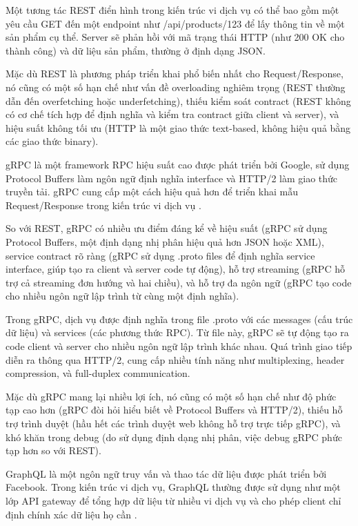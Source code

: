 Một tương tác REST điển hình trong kiến trúc vi dịch vụ có thể bao gồm một yêu cầu GET đến một endpoint như /api/products/123 để lấy thông tin về một sản phẩm cụ thể. Server sẽ phản hồi với mã trạng thái HTTP (như 200 OK cho thành công) và dữ liệu sản phẩm, thường ở định dạng JSON.

Mặc dù REST là phương pháp triển khai phổ biến nhất cho Request/Response, nó cũng có một số hạn chế như vấn đề overloading nghiêm trọng (REST thường dẫn đến overfetching hoặc underfetching), thiếu kiểm soát contract (REST không có cơ chế tích hợp để định nghĩa và kiểm tra contract giữa client và server), và hiệu suất không tối ưu (HTTP là một giao thức text-based, không hiệu quả bằng các giao thức binary).


gRPC là một framework RPC hiệu suất cao được phát triển bởi Google, sử dụng Protocol Buffers làm ngôn ngữ định nghĩa interface và HTTP/2 làm giao thức truyền tải. gRPC cung cấp một cách hiệu quả hơn để triển khai mẫu Request/Response trong kiến trúc vi dịch vụ \cite{indrasiri2020}.

So với REST, gRPC có nhiều ưu điểm đáng kể về hiệu suất (gRPC sử dụng Protocol Buffers, một định dạng nhị phân hiệu quả hơn JSON hoặc XML), service contract rõ ràng (gRPC sử dụng .proto files để định nghĩa service interface, giúp tạo ra client và server code tự động), hỗ trợ streaming (gRPC hỗ trợ cả streaming đơn hướng và hai chiều), và hỗ trợ đa ngôn ngữ (gRPC tạo code cho nhiều ngôn ngữ lập trình từ cùng một định nghĩa).

Trong gRPC, dịch vụ được định nghĩa trong file .proto với các messages (cấu trúc dữ liệu) và services (các phương thức RPC). Từ file này, gRPC sẽ tự động tạo ra code client và server cho nhiều ngôn ngữ lập trình khác nhau. Quá trình giao tiếp diễn ra thông qua HTTP/2, cung cấp nhiều tính năng như multiplexing, header compression, và full-duplex communication.

Mặc dù gRPC mang lại nhiều lợi ích, nó cũng có một số hạn chế như độ phức tạp cao hơn (gRPC đòi hỏi hiểu biết về Protocol Buffers và HTTP/2), thiếu hỗ trợ trình duyệt (hầu hết các trình duyệt web không hỗ trợ trực tiếp gRPC), và khó khăn trong debug (do sử dụng định dạng nhị phân, việc debug gRPC phức tạp hơn so với REST).

GraphQL là một ngôn ngữ truy vấn và thao tác dữ liệu được phát triển bởi Facebook. Trong kiến trúc vi dịch vụ, GraphQL thường được sử dụng như một lớp API gateway để tổng hợp dữ liệu từ nhiều vi dịch vụ và cho phép client chỉ định chính xác dữ liệu họ cần \cite{wittern2018}.

